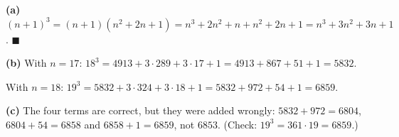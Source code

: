 \textbf{(a)} $(n+1)^3=(n+1)\left(n^2+2n+1\right)=n^3+2n^2+n+n^2+2n+1=n^3+3n^2+3n+1$. $\blacksquare$

\textbf{(b)} With $n=17$: $18^3=4913+3\cdot289+3\cdot17+1=4913+867+51+1=\boxed{5832}$.

With $n=18$: $19^3=5832+3\cdot324+3\cdot18+1=5832+972+54+1=\boxed{6859}$.

\textbf{(c)} The four terms are correct, but they were added wrongly: $5832+972=6804$, $6804+54=6858$ and $6858+1=6859$, not $6853$. (Check: $19^3=361\cdot19=6859$.)
